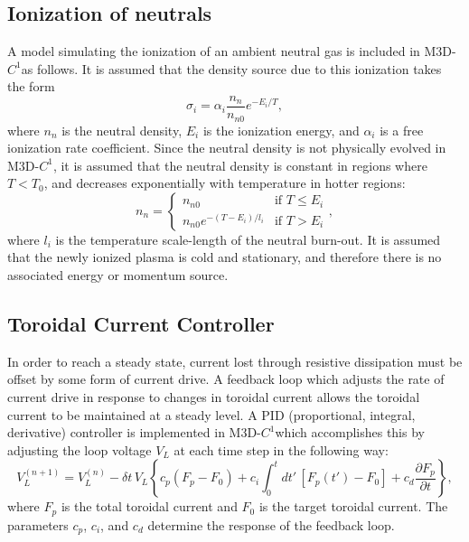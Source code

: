 \documentclass[letterpaper]{book}
\newcommand{\dt}{\ensuremath{\delta t}}
\newcommand{\ddt}[1]{\frac{\partial #1}{\partial t}}
\newcommand{\codename}{\textsc{M3D-$C^1$}}
\begin{document}
\subsection{Ionization of neutrals \label{sec:ionization}}

A model simulating the ionization of an ambient neutral gas is
included in \codename as follows.  It is assumed that the density
source due to this ionization takes the form
\begin{equation}
  \sigma_i = \alpha_i \frac{n_n}{n_{n 0}} e^{-E_i / T},
\end{equation}
where $n_n$ is the neutral density, $E_i$ is the ionization energy,
and $\alpha_i$ is a free ionization rate coefficient.  Since the
neutral density is not physically evolved in \codename, it is assumed
that the neutral density is constant in regions where $T < T_0$, and
decreases exponentially with temperature in hotter regions:
\begin{equation}
  n_n =
  \begin{cases}
    n_{n 0} & \text{if $T \le E_i$}\\
    n_{n 0} e^{-(T - E_i) / l_i} & \text{if $T > E_i$}
  \end{cases},
\end{equation}
where $l_i$ is the temperature scale-length of the neutral burn-out.
It is assumed that the newly ionized plasma is cold and stationary,
and therefore there is no associated energy or momentum source.



\subsection{Toroidal Current Controller \label{sec:current_controller}}

In order to reach a steady state, current lost through resistive
dissipation must be offset by some form of current drive.  A feedback
loop which adjusts the rate of current drive in response to changes in
toroidal current allows the toroidal current to be maintained at a
steady level.  A PID (proportional, integral, derivative) controller
is implemented in \codename which accomplishes this by adjusting the
loop voltage $V_L$ at each time step in the following way:
\begin{equation}
  V_L^{(n+1)} = V_L^{(n)} - \dt\, V_L \left\{ c_p (F_p - F_0) + c_i
  \int_0^t dt'\,[F_p(t') - F_0] + c_d \ddt{F_p} \right\},
\end{equation}
where $F_p$ is the total toroidal current and $F_0$ is the target
toroidal current.  The parameters $c_p$, $c_i$, and $c_d$ determine
the response of the feedback loop.
\end{document}
